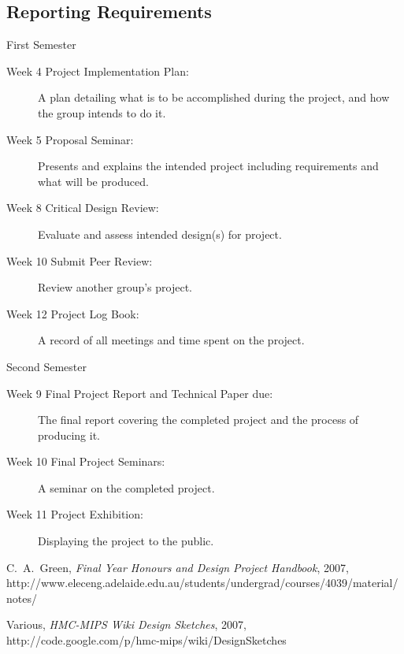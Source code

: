 \documentclass[a4paper,12pt]{article}
\begin{document}
\subsection{Reporting Requirements}

First Semester
\begin{description}
\item[Week 4 Project Implementation Plan:] A plan detailing what is to
  be accomplished during the project, and how the group intends to do
  it.
\item[Week 5 Proposal Seminar:] Presents and explains the intended
  project including requirements and what will be produced.
\item[Week 8 Critical Design Review:] Evaluate and assess intended
  design(s) for project.
\item[Week 10 Submit Peer Review:] Review another group's project.
\item[Week 12 Project Log Book:] A record of all meetings and time
  spent on the project.
\end{description}

Second Semester
\begin{description}
\item[Week 9 Final Project Report and Technical Paper due:] The final
report covering the completed project and the process of producing it.
\item[Week 10 Final Project Seminars:] A seminar on the completed
project.  
\item[Week 11 Project Exhibition:] Displaying the project to the
public.
\end{description}

%














\begin{thebibliography}{99}

 C.~A.~Green, \emph{Final Year Honours and Design
  Project Handbook}, 2007, http://www.eleceng.adelaide.edu.au/students/undergrad/courses/4039/material/notes/

 Various, \emph{HMC-MIPS Wiki Design Sketches},
2007, http://code.google.com/p/hmc-mips/wiki/DesignSketches

\end{thebibliography}
\end{document}
